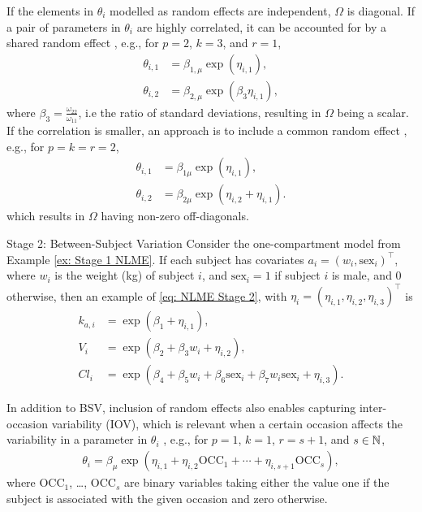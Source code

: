 If the elements in $\theta_i$ modelled as random effects are independent, $\Omega$ is diagonal. 
If a pair of parameters in $\theta_i$ are highly correlated, it can be accounted for by a shared random effect \citep[p. 239]{bonate}, e.g., for $p = 2$, $k = 3$, and $r = 1$,
\begin{align*}
    \theta_{i,1} &= \beta_{1, \mu} \exp(\eta_{i,1}), \\
     \theta_{i,2} &= \beta_{2, \mu} \exp(\beta_3 \eta_{i,1}),
\end{align*}
where $\beta_3 = \frac{\omega_{22}}{\omega_{11}}$, i.e the ratio of standard deviations, resulting in $\Omega$ being a scalar. If the correlation is smaller, an approach is to include a common random effect \citep[p. 240]{bonate}, e.g., for $ p = k = r = 2$,
\begin{align*}
    \theta_{i,1}  & = \beta_{1\mu} \exp(\eta_{i,1}), \\
     \theta_{i,2} & = \beta_{2\mu} \exp(\eta_{i,2} + \eta_{i,1}).
\end{align*}
which results in $\Omega$ having non-zero off-diagonals.

\begin{exmp}{Stage 2: Between-Subject Variation}
Consider the one-compartment model from Example \ref{ex: Stage 1 NLME}. If each subject has covariates $a_i=(w_i,\text{sex}_i)^\top$, where $w_i$ is the weight (kg) of subject $i$, and $\text{sex}_i=1$ if subject $i$ is male, and  $0$ otherwise, then an example of \eqref{eq: NLME Stage 2}, with $\eta_i=(\eta_{i,1},\eta_{i,2},\eta_{i,3})^\top$ is \label{ex: Stage 2 NLME}
\begin{align*}
    k_{a,i}&=\exp(\beta_1+\eta_{i,1}),\\
    V_{i}&=\exp(\beta_2+\beta_3w_i+\eta_{i,2}),\\
    Cl_i &= \exp(\beta_4+\beta_5w_i+\beta_6\text{sex}_i+\beta_7w_i\text{sex}_i+\eta_{i,3}).
\end{align*}
\end{exmp}
In addition to BSV, inclusion of random effects also enables capturing inter-occasion variability (IOV), which is relevant when a certain occasion affects the variability in a parameter in $\theta_i$ \citep[pp. 241-243]{bonate}, e.g., for $p = 1$, $k = 1$, $r = s + 1$, and $s \in \mathbb{N}$,
\begin{align} \label{eq: IOV with studies}
    \theta_{i} = \beta_\mu \exp(\eta_{i,1} + \eta_{i,2} \text{OCC}_1 + \cdots + \eta_{i,s+1} \text{OCC}_s),
\end{align}
where OCC$_1$, \dots , OCC$_s$ are binary variables taking either the value one if the subject is associated with the given occasion and zero otherwise.

